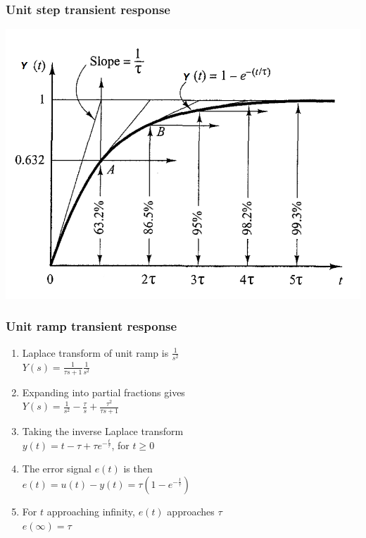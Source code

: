 \begin{frame}
\frametitle{Unit step transient response}
\includegraphics[width=0.8\linewidth]{Afbeelding2}
\end{frame}

\begin{frame}
\frametitle{Unit ramp transient response}
\begin{enumerate}
\vspace{0.2cm}
\item Laplace transform of unit ramp is $\frac{1}{s^2}$
\vspace{0.1cm}
\\ $Y(s) = \frac{1}{\tau s +1} \frac{1}{s^2}$
\vspace{0.2cm}
\pause
\item Expanding into partial fractions gives
\vspace{0.1cm}
\\ $Y(s)= \frac{1}{s^2} - \frac{\tau}{s} + \frac{\tau^2}{\tau s +1}$
\vspace{0.2cm}
\pause
\item Taking the inverse Laplace transform 
\vspace{0.1cm}
\\ $y(t) = t -\tau + \tau e^{-\frac{t}{\tau}}$, for $t\ge 0$
\vspace{0.2cm}
\pause
\item The error signal $e(t)$ is then
\vspace{0.1cm}
\\ $e(t)=u(t) -y(t) = \tau(1-e^{-\frac{t}{\tau}})$
\vspace{0.2cm}
\pause
\item For $t$ approaching infinity, $e(t)$ approaches $\tau$
\vspace{0.1cm}
\\ $e(\infty) = \tau$
\end {enumerate}
\end{frame}

